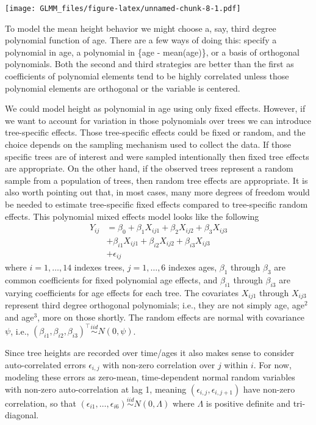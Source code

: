 \documentclass[
]{book}
\begin{document}
\texttt{[image: GLMM\_files/figure-latex/unnamed-chunk-8-1.pdf]}

To model the mean height behavior we might choose a, say, third degree polynomial function of age. There are a few ways of doing this: specify a polynomial in age, a polynomial in \{age - mean(age)\}, or a basis of orthogonal polynomials. Both the second and third strategies are better than the first as coefficients of polynomial elements tend to be highly correlated unless those polynomial elements are orthogonal or the variable is centered.

We could model height as polynomial in age using only fixed effects. However, if we want to account for variation in those polynomials over trees we can introduce tree-specific effects. Those tree-specific effects could be fixed or random, and the choice depends on the sampling mechanism used to collect the data. If those specific trees are of interest and were sampled intentionally then fixed tree effects are appropriate. On the other hand, if the observed trees represent a random sample from a population of trees, then random tree effects are appropriate. It is also worth pointing out that, in most cases, many more degrees of freedom would be needed to estimate tree-specific fixed effects compared to tree-specific random effects. This polynomial mixed effects model looks like the following
\begin{align*}
Y_{ij} &= \beta_0 + \beta_1 X_{ij1}+ \beta_2 X_{ij2}+ \beta_3 X_{ij3}\\
       &+ \beta_{i1} X_{ij1}+ \beta_{i2} X_{ij2}+ \beta_{i3} X_{ij3}\\
       & + \epsilon_{ij}
\end{align*}
where \(i=1, \ldots, 14\) indexes trees, \(j = 1, \ldots, 6\) indexes ages, \(\beta_1\) through \(\beta_3\) are common coefficients for fixed polynomial age effects, and \(\beta_{i1}\) through \(\beta_{i3}\) are varying coefficients for age effects for each tree. The covariates \(X_{ij1}\) through \(X_{ij3}\) represent third degree orthogonal polynomials; i.e., they are not simply age, age\(^2\) and age\(^3\), more on those shortly. The random effects are normal with covariance \(\psi\), i.e., \((\beta_{i1},\beta_{i2},\beta_{i3})^\top \stackrel{iid}{\sim}N(0,\psi)\).

Since tree heights are recorded over time/ages it also makes sense to consider auto-correlated errors \(\epsilon_{i,j}\) with non-zero correlation over \(j\) within \(i\). For now, modeling these errors as zero-mean, time-dependent normal random variables with non-zero auto-correlation at lag 1, meaning \((\epsilon_{i,j}, \epsilon_{i,j+1})\) have non-zero correlation, so that \((\epsilon_{i1},\ldots, \epsilon_{i6})\stackrel{iid}{\sim} N(0,\Lambda)\) where \(\Lambda\) is positive definite and tri-diagonal.
\end{document}

